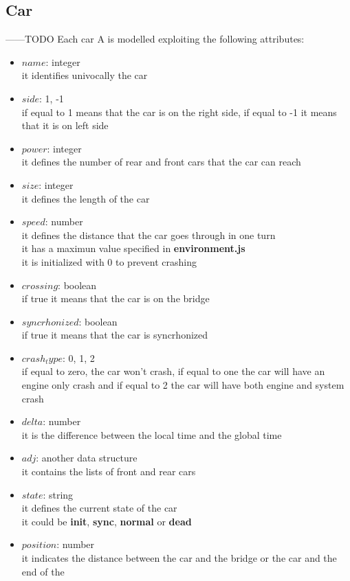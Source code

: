 \subsection{Car}
------TODO
Each car A is modelled exploiting the following attributes:
\begin{itemize}
    \item $name$: integer\\ it identifies univocally the car
    \item $side$: {1, -1}\\ if equal to 1 means that the car is on the right side, 
    if equal to -1 it means that it is on left side
    \item $power$: integer\\ it defines the number of rear and front cars that the car can reach
    \item $size$: integer \\ it defines the length of the car
    \item $speed$: number\\ it defines the distance that the car goes through in one turn\\
    it has a maximun value specified in \textbf{environment.js}\\
    it is initialized with 0 to prevent crashing 
    \item $crossing$: boolean\\ if true it means that the car is on the bridge
    \item $syncrhonized$: boolean\\ if true it means that the car is syncrhonized    
    \item $crash_type$: {0, 1, 2}\\ if equal to zero, the car won't crash, if equal to one the car will have an engine only crash
    and if equal to 2 the car will have both engine and system crash 
    \item $delta$: number\\ it is the difference between the local time and the global time
    \item $adj$: another data structure\\ it contains the lists of front and rear cars
    \item $state$: string\\ it defines the current state of the car\\ it could be \textbf{init}, \textbf{sync}, \textbf{normal} or \textbf{dead}
    \item $position$: number \\it indicates the distance between the car and the bridge or the car and the end of the

\end{itemize}
